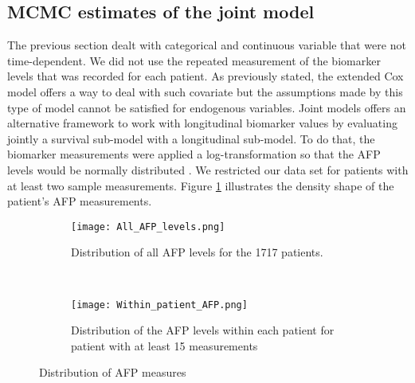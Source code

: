 \documentclass[11pt,twoside]{article}
\numberwithin{Theorem}{section}
\numberwithin{Definition}{section}
\numberwithin{Lemma}{section}
\numberwithin{Algorithm}{section}
\numberwithin{equation}{section}
\begin{document}
\subsection{MCMC estimates of the joint model}
The previous section dealt with categorical and continuous variable that were not time-dependent. We did not use the repeated measurement of the biomarker levels that was recorded for each patient. As previously stated, the extended Cox model offers a way to deal with such covariate but the assumptions made by this type of model cannot be satisfied for endogenous variables. Joint models \cite{laird1982random} offers an alternative framework to work with longitudinal biomarker values by evaluating jointly a survival sub-model with a longitudinal sub-model.
%
To do that, the biomarker measurements were applied a log-transformation so that the AFP levels would be normally distributed \cite{Teofanescu2007}. We restricted our data set for patients with at least two sample measurements. Figure \ref{fig:AFP_dist} illustrates the density shape of the patient's AFP measurements.
%
\begin{figure}[h!]
    \centering
    \begin{subfigure}[t]{0.5\textwidth}
        \centering
        \texttt{[image: All\_AFP\_levels.png]}
        \caption{Distribution of all AFP levels for the 1717 patients.}
    \end{subfigure}%
    ~
    \begin{subfigure}[t]{0.5\textwidth}
        \centering
        \texttt{[image: Within\_patient\_AFP.png]}
        \caption{Distribution of the AFP levels within each patient for patient with at least 15 measurements}
    \end{subfigure}
    \caption{Distribution of AFP measures}
    \label{fig:AFP_dist}
\end{figure}
 \\ \\
\end{document}
